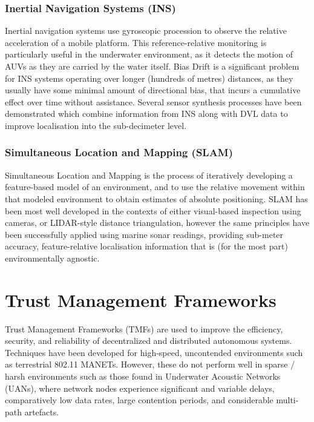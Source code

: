 \documentclass[conference]{IEEEtran}
\begin{document}
\subsubsection{Inertial Navigation Systems (INS)}
Inertial navigation systems use gyroscopic procession to observe the relative acceleration of a mobile platform.
This reference-relative monitoring is particularly useful in the underwater environment, as it detects the motion of AUVs as they are carried by the water itself.
Bias Drift is a significant problem for INS systems operating over longer (hundreds of metres) distances, as they usually have some minimal amount of directional bias, that incurs a cumulative effect over time without assistance.
Several sensor synthesis processes have been demonstrated which combine information from INS along with DVL data to improve localisation into the sub-decimeter level\cite{Jalving2003}\cite{Liu2014}.

\subsubsection{Simultaneous Location and Mapping (SLAM)}
Simultaneous Location and Mapping is the process of iteratively developing a feature-based model of an environment, and to use the relative movement within that modeled environment to obtain estimates of absolute positioning.
SLAM has been most well developed in the contexts of either visual-based inspection using cameras, or LIDAR-style distance triangulation, however the same principles have been successfully applied using marine sonar readings, providing sub-meter accuracy, feature-relative localisation information that is (for the most part) environmentally agnostic\cite{Williams2000}.


\section{Trust Management Frameworks}\label{sec:tmfs}

Trust Management Frameworks (TMFs) are used to improve the efficiency, security, and reliability of decentralized and distributed autonomous systems. 
Techniques have been developed for high-speed, uncontended environments such as terrestrial 802.11 MANETs. 
However, these do not perform well in sparse / harsh environments such as those found in Underwater Acoustic Networks (UANs), where network nodes experience significant and variable delays, comparatively low data rates, large contention periods, and considerable multi-path artefacts.\cite{Bolster2015} 
\end{document}
